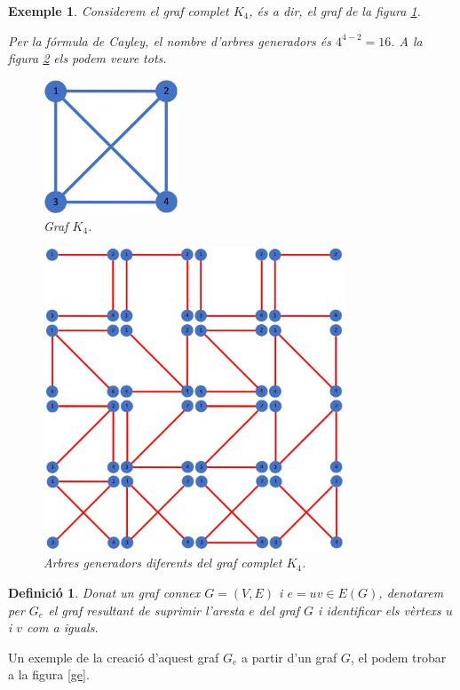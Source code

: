 \documentclass{article}
\newtheorem{definition}{Definició}[section]
\newtheorem{example}{Exemple}[section]
\begin{document}
\begin{example}\label{ex1}
Considerem el graf complet $K_4$, és a dir, el graf de la figura \ref{k4}.\par Per la fórmula de Cayley, el nombre d'arbres generadors és $4^{4-2} = 16$. A la figura \ref{k4_16} els podem veure tots.
\begin{figure}[H]
\centering
\includegraphics[width=4cm]{imatges/graf2.jpg}
  \caption{Graf $K_4$.}
  \label{k4}
\end{figure}
\begin{figure}[H]
\centering
\includegraphics[width=9cm]{imatges/graf2_16.jpg}
  \caption{Arbres generadors diferents del graf complet $K_4$.}
  \label{k4_16}
\end{figure}
\end{example}
\begin{definition}
Donat un graf connex $G =(V,E)$ i $e = uv \in E(G)$, denotarem per $G_e$ el graf resultant de suprimir l'aresta $e$ del graf $G$ i identificar els vèrtexs $u$ i $v$ com a iguals.
\end{definition}
Un exemple de la creació d'aquest graf $G_e$ a partir d'un graf $G$, el podem trobar a la figura \ref{ge}.
\end{document}
